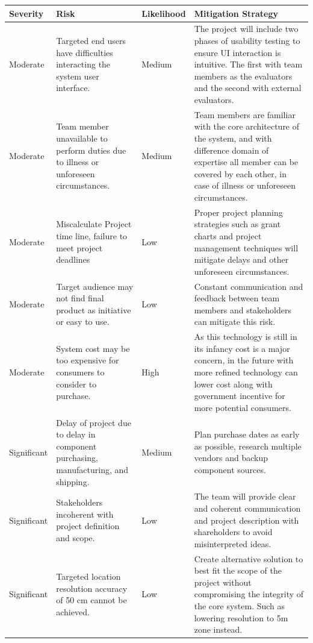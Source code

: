 \pagebreak
\begin{table}[H]
\centering
\def\arraystretch{1.3}
\begin{tabular}{ | m{1.6cm} | m{4cm}| m{2cm} | m{7.4cm}|}
\hline
\rowcolor{lightgray} \textbf{Severity} & \textbf{Risk} & \textbf{Likelihood} & \textbf{Mitigation Strategy}\\
\hline
Moderate & Targeted end users have difficulties interacting the system user interface. & Medium & The project will include two phases of usability testing to ensure UI interaction is intuitive. The first with team members as the evaluators and the second with external evaluators. \\
\hline
Moderate & Team member unavailable to perform duties due to illness or unforeseen circumstances. & Medium & Team members are familiar with the core architecture of the system, and with difference domain of expertise all member can be covered by each other, in case of illness or unforeseen circumstances. \\
\hline
Moderate & Miscalculate Project time line, failure to meet project deadlines & Low & Proper project planning strategies such as grant charts and project management techniques will mitigate delays and other unforeseen circumstances. \\
\hline
Moderate & Target audience may not find final product as initiative or easy to use. & Low & Constant communication and feedback between team members and stakeholders can mitigate this risk. \\
\hline
Moderate & System cost may be too expensive for consumers to consider to purchase. & High & As this technology is still in its infancy cost is a major concern, in the future with more refined technology can lower cost along with government incentive for more potential consumers. \\
\hline
Significant & Delay of project due to delay in component purchasing, manufacturing, and shipping. & Medium & Plan purchase dates as early as possible, research multiple vendors and backup component sources. \\
\hline
Significant & Stakeholders incoherent with project definition and scope. & Low & The team will provide clear and coherent communication and project description with shareholders to avoid misinterpreted ideas. \\
\hline
Significant & Targeted location resolution accuracy of 50 cm cannot be achieved. & Low & Create alternative solution to best fit the scope of the project without compromising the integrity of the core system. Such as lowering resolution to 5m zone instead.\\

\end{tabular}
\end{table}
